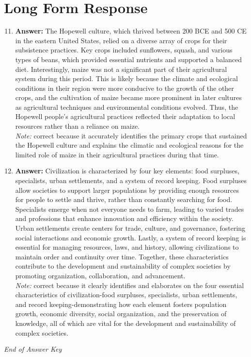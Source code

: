 \documentclass[12pt]{article}
\begin{document}
\section*{Long Form Response}
\begin{enumerate}[label=\arabic*.]
\setcounter{enumi}{10}
\item \textbf{Answer:} The Hopewell culture, which thrived between 200 BCE and 500 CE in the eastern United States, relied on a diverse array of crops for their subsistence practices. Key crops included sunflowers, squash, and various types of beans, which provided essential nutrients and supported a balanced diet. Interestingly, maize was not a significant part of their agricultural system during this period. This is likely because the climate and ecological conditions in their region were more conducive to the growth of the other crops, and the cultivation of maize became more prominent in later cultures as agricultural techniques and environmental conditions evolved. Thus, the Hopewell people's agricultural practices reflected their adaptation to local resources rather than a reliance on maize.
\\ \textit{Note:} correct because it accurately identifies the primary crops that sustained the Hopewell culture and explains the climatic and ecological reasons for the limited role of maize in their agricultural practices during that time.
\item \textbf{Answer:} Civilization is characterized by four key elements: food surpluses, specialists, urban settlements, and a system of record keeping. Food surpluses allow societies to support larger populations by providing enough resources for people to settle and thrive, rather than constantly searching for food. Specialists emerge when not everyone needs to farm, leading to varied trades and professions that enhance innovation and efficiency within the society. Urban settlements create centers for trade, culture, and governance, fostering social interactions and economic growth. Lastly, a system of record keeping is essential for managing resources, laws, and history, allowing civilizations to maintain order and continuity over time. Together, these characteristics contribute to the development and sustainability of complex societies by promoting organization, collaboration, and advancement.
\\ \textit{Note:} correct because it clearly identifies and elaborates on the four essential characteristics of civilization-food surpluses, specialists, urban settlements, and record keeping-demonstrating how each element fosters population growth, economic diversity, social organization, and the preservation of knowledge, all of which are vital for the development and sustainability of complex societies.
\end{enumerate}

\vfill
\noindent\textit{End of Answer Key}
\end{document}
